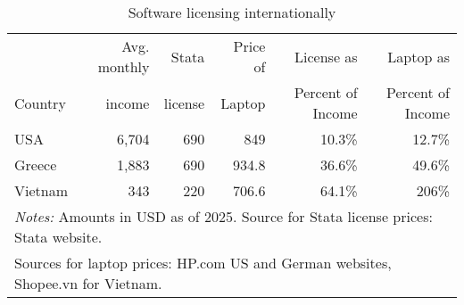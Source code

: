 \begin{table}[h]
\centering
\caption{Software licensing internationally} 
\label{tab:licensecost}
\begin{tabular}{lrrrrr}
  \toprule
        &  Avg. monthly & Stata  &  Price of & License as  & Laptop as \\
Country &        income & license & Laptop & Percent of Income & Percent of Income \\ 
  \midrule
USA & 6,704 & 690 & 849 & 10.3\% & 12.7\% \\ 
  Greece & 1,883 & 690 & 934.8 & 36.6\% & 49.6\% \\ 
  Vietnam & 343 & 220 & 706.6 & 64.1\% & 206\% \\ 
   \midrule 
\multicolumn{6}{l}{\textit{Notes:} Amounts in USD as of 2025. Source for Stata license prices: Stata website.}\\
\multicolumn{6}{l}{Sources for laptop prices: HP.com US and German websites, Shopee.vn for Vietnam.}\\
 \bottomrule
\end{tabular}
\end{table}
